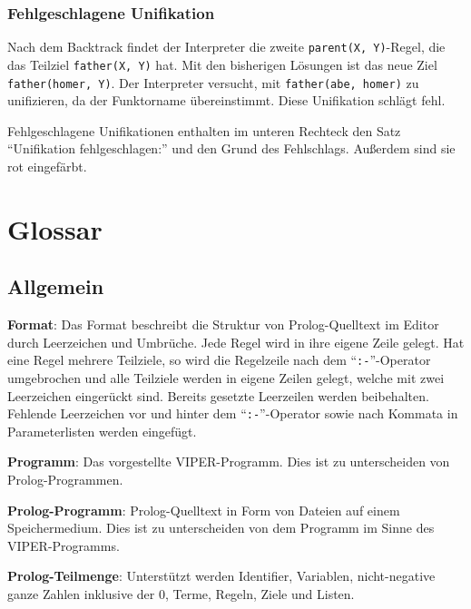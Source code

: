 \documentclass[parskip=full,11pt,twoside]{scrartcl}
\begin{document}
\subsubsection{Fehlgeschlagene Unifikation}

Nach dem Backtrack findet der Interpreter die zweite \texttt{parent(X, Y)}-Regel, die das Teilziel \texttt{father(X, Y)} hat.
Mit den bisherigen Lösungen ist das neue Ziel \texttt{father(homer, Y)}.
Der Interpreter versucht, mit \texttt{father(abe, homer)} zu unifizieren, da der Funktorname übereinstimmt.
Diese Unifikation schlägt fehl.

\begin{minipage}{\linewidth}
\end{minipage}

Fehlgeschlagene Unifikationen enthalten im unteren Rechteck den Satz \enquote{Unifikation fehlgeschlagen:} und den Grund des Fehlschlags.
Außerdem sind sie rot eingefärbt.

\section{Glossar}

\subsection{Allgemein}

\textbf{Format}:
Das Format beschreibt die Struktur von Prolog-Quelltext im Editor durch Leerzeichen und Umbrüche. Jede Regel wird in ihre eigene Zeile gelegt. Hat eine Regel mehrere Teilziele, so wird die Regelzeile nach dem \enquote{\texttt{:-}}-Operator umgebrochen und alle Teilziele werden in eigene Zeilen gelegt, welche mit zwei Leerzeichen eingerückt sind. Bereits gesetzte Leerzeilen werden beibehalten. Fehlende Leerzeichen vor und hinter dem \enquote{\texttt{:-}}-Operator sowie nach Kommata in Parameterlisten werden eingefügt.

\textbf{Programm}:
Das vorgestellte VIPER-Programm. Dies ist zu unterscheiden von Prolog-Programmen.

\textbf{Prolog-Programm}:
Prolog-Quelltext in Form von Dateien auf einem Speichermedium. Dies ist zu unterscheiden von dem Programm im Sinne des VIPER-Programms.

\textbf{Prolog-Teilmenge}:
Unterstützt werden Identifier, Variablen, nicht-negative ganze Zahlen inklusive der 0, Terme, Regeln, Ziele und Listen.
\end{document}
